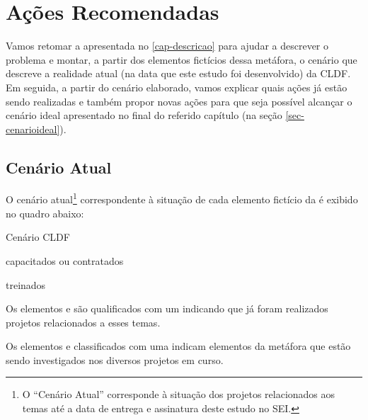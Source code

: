 \chapter{Ações Recomendadas}
\label{cap-acoes}

    Vamos retomar a \METAFORADORESTAURANTE \xspace apresentada no \autoref{cap-descricao} para ajudar a descrever o problema e montar, a partir dos elementos fictícios dessa metáfora, o cenário que descreve a realidade atual (na data que este estudo foi desenvolvido) da CLDF. Em seguida, a partir do cenário elaborado, vamos explicar quais ações já estão sendo realizadas e também propor novas ações para que seja possível alcançar o cenário ideal apresentado no final do referido capítulo (na seção \ref{sec-cenarioideal}).
    
    \section{Cenário Atual}
    
    O cenário atual\footnote{O ``Cenário Atual'' corresponde à situação dos projetos relacionados aos temas até a data de entrega e assinatura deste estudo no SEI.} correspondente à situação de cada elemento fictício da \METAFORA \xspace é exibido no quadro abaixo:
    
    \begin{env-cenario2}{Cenário CLDF}
            \mschecksim \xspace \CLIENTES 
            
            \mschecksim \xspace \CARDAPIO  

            \mscheckint \xspace \LIVRODERECEITAS
            
            \mscheckint \xspace \FOGAO

            \mschecknao \xspace \COZINHEIROS \xspace capacitados ou contratados
        
            \mschecknao \xspace \GERENTES \xspace treinados

            \mschecknao \xspace \DESPENSA

            \mschecknao \xspace \INGREDIENTES
    \end{env-cenario2}

    Os elementos \CLIENTES \xspace e \CARDAPIO \xspace são qualificados com um \mschecksim \xspace indicando que já foram realizados projetos relacionados a esses temas.
    
    Os elementos \LIVRODERECEITAS \xspace e \FOGAO \xspace classificados com uma \mscheckint \xspace indicam elementos da metáfora que estão sendo investigados nos diversos projetos em curso.
    
